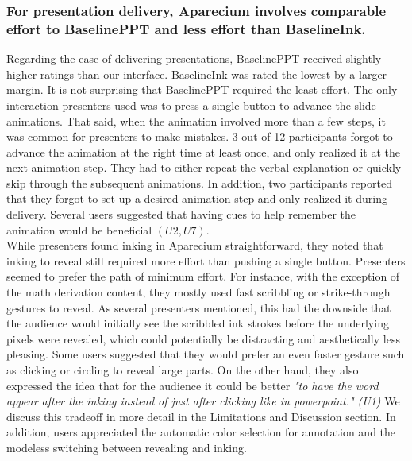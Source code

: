 \subsubsection{For presentation delivery, Aparecium involves comparable effort to BaselinePPT and less effort than BaselineInk.}
%
Regarding the ease of delivering presentations, BaselinePPT received slightly higher ratings than our interface. BaselineInk was rated the lowest by a larger margin. 
%
It is not surprising that BaselinePPT required the least effort. The only interaction presenters used was to press a single button to advance the slide animations. That said, when the animation involved more than a few steps, it was common for presenters to make mistakes. 3 out of 12 participants forgot to advance the animation at the right time at least once, and only realized it at the next animation step. They had to either repeat the verbal explanation or quickly skip through the subsequent animations. In addition, two participants reported that they forgot to set up a desired animation step and only realized it during delivery. Several users suggested that having cues to help remember the animation would be beneficial $(U2, U7)$.\\

While presenters found inking in Aparecium straightforward, they noted that inking to reveal still required more effort than pushing a single button. Presenters seemed to prefer the path of minimum effort. For instance, with the exception of the math derivation content, they mostly used fast scribbling or strike-through gestures to reveal. As several presenters mentioned, this had the downside that the audience would initially see the scribbled ink strokes before the underlying pixels were revealed, which could potentially be distracting and aesthetically less pleasing. Some users suggested that they would prefer an even faster gesture such as clicking or circling to reveal large parts. On the other hand, they also expressed the idea that for the audience it could be better \textit{"to have the word appear after the inking instead of just after clicking like in powerpoint." (U1)} We discuss this tradeoff in more detail in the Limitations and Discussion section. In addition, users appreciated the automatic color selection for annotation and the modeless switching between revealing and inking. \\

